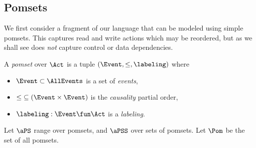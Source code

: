 

\subsection{Pomsets}
\label{sec:pomsets}

We first consider a fragment of our language that can be modeled using simple
pomsets.  This captures read and write actions which may be reordered,
but as we shall see does \emph{not} capture control or data dependencies.

\begin{definition}
  \label{def:pomsets}
  A \emph{pomset} over $\Act$ is a tuple
  $(\Event, {\le}, \labeling)$ where
  \begin{itemize}
  \item $\Event\subset\AllEvents$ is a set of \emph{events},
  \item
    ${\le} \subseteq (\Event\times\Event)$ is the \emph{causality} partial order, 
  \item
    $\labeling: \Event \fun \Act$ is a \emph{labeling}.
  \end{itemize}
\end{definition}
Let $\aPS$ range over pomsets, and $\aPSS$ over sets of pomsets.  Let $\Pom$
be the set of all pomsets.

